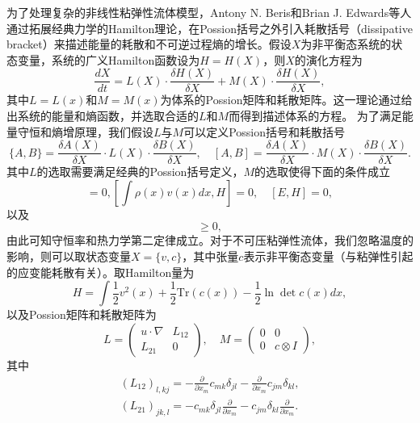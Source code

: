 为了处理复杂的非线性粘弹性流体模型，Antony N. Beris和Brian J. Edwards等人通过拓展经典力学的Hamilton理论，在Possion括号之外引入耗散括号（dissipative bracket）来描述能量的耗散和不可逆过程熵的增长\cite{edwards1990remarks,beris2013thermodynamics}。假设$X$为非平衡态系统的状态变量，系统的广义Hamilton函数设为$H=H(X)$，则$X$的演化方程为
\begin{equation*}
	\frac{dX}{dt} = L(X) \cdot \frac{\delta H(X)}{\delta X} + M(X) \cdot \frac{\delta H(X)}{\delta X}, 
\end{equation*}
其中$L=L(x)$和$M=M(x)$为体系的Possion矩阵和耗散矩阵。这一理论通过给出系统的能量和熵函数，并选取合适的$L$和$M$而得到描述体系的方程。 为了满足能量守恒和熵增原理，我们假设$L$与$M$可以定义Possion括号和耗散括号
\begin{equation*}
	\{ A,B \} = \frac{\delta A(X)}{\delta X} \cdot L(X) \cdot \frac{\delta B(X)}{\delta X}, \quad  [ A,B ] = \frac{\delta A(X)}{\delta X} \cdot M(X) \cdot \frac{\delta B(X)}{\delta X}. 
\end{equation*}
其中$L$的选取需要满足经典的Possion括号定义，$M$的选取使得下面的条件成立
\begin{equation*}
	[\int \rho(x) dx, H]=0,[\int \rho(x) v(x) dx, H]=0, \quad [E,H] = 0,
\end{equation*}
以及
\begin{equation*}
	[S,H] \ge 0,
\end{equation*}
由此可知守恒率和热力学第二定律成立。对于不可压粘弹性流体，我们忽略温度的影响，则可以取状态变量$X= 
 \{v,c\}$，其中张量$c$表示非平衡态变量（与粘弹性引起的应变能耗散有关）。取Hamilton量为
 \begin{equation*}
 	H = \int \frac{1}{2} v^2(x) + \frac{1}{2} \mbox{
 	Tr}(c(x))- \frac{1}{2}  \ln \det c(x) dx,
 \end{equation*}
以及Possion矩阵和耗散矩阵为
\begin{equation*}
	L = \left( \begin{array}{cc} 
			u \cdot \nabla &  L_{12} \\
			L_{21}& 0
		\end{array}\right), \quad
	M =	\left( \begin{array}{cc} 
			0  & 0 \\
			0  & c \otimes I
		\end{array}\right),
\end{equation*}
其中
\begin{eqnarray*}
	(L_{12})_{l,kj} = - \frac{\partial}{\partial x_m} c_{mk} \delta_{jl} -  \frac{\partial}{\partial x_m} c_{jm} \delta_{kl}, \\
	(L_{21})_{jk,l} = -c_{mk} \delta_{jl} \frac{\partial}{\partial x_m} - c_{jm} \delta_{kl} \frac{\partial}{\partial x_m}.
\end{eqnarray*}
